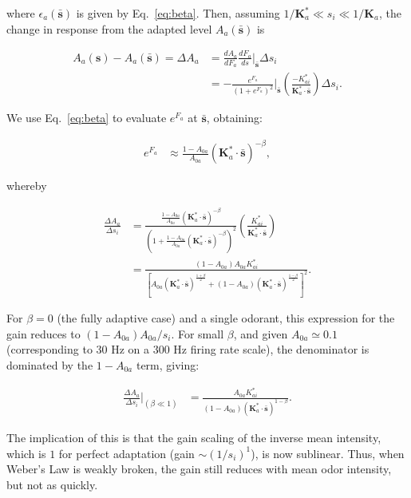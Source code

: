\documentclass[9pt,lineno]{elife}
\begin{document}
where $\epsilon_a(\bar {\mathbf s})$ is given by Eq.~\ref{eq:beta}.
Then, assuming $1/\mathbf{K}^*_a \ll s_i \ll 1/\mathbf{K}_a$, the change in response from the adapted level $A_a(\bar {\mathbf s})$ is

\begin{align}
A_a(\mathbf s) - A_a(\bar {\mathbf s}) = {\Delta A_a}%
&= \frac{dA_a}{dF_a}\frac{dF_a}{ds}\bigg|_{\bar {\mathbf s}}\Delta s_i \nonumber \\
&= -\frac{e^{F_a}}{(1 + e^{F_a})^2}\bigg|_{\bar {\mathbf s}}
\left(\frac{-K^*_{ai}}{\mathbf{K}^*_a\cdot \bar {\mathbf{s}}}\right) \Delta s_i.
\end{align}

We use Eq.~\ref{eq:beta} to evaluate $e^{F_a}$ at $\bar {\mathbf s}$, obtaining:

\begin{align}
e^{F_a} &\approx \frac{1 - A_{0a}}{A_{0a}}
(\mathbf{K}^*_a\cdot \bar {\mathbf{s}})^{-\beta},
\end{align}

whereby

\begin{align}
\frac{\Delta A_a}
{\Delta s_i}%
&= 
\frac{
	\frac{1 - A_{0a}}{A_{0a}}
	(\mathbf{K}^*_a\cdot \bar {\mathbf{s}})^{-\beta}
}
{(1 + \frac{1 - A_{0a}}{A_{0a}}
	(\mathbf{K}^*_a\cdot \bar {\mathbf{s}})^{-\beta})^2
}
\left(\frac{K^*_{ai}}{\mathbf{K}^*_a\cdot \bar {\mathbf{s}}}\right)\nonumber \\
&=\frac{(1 - A_{0a})A_{0a}K^*_{ai}}
{
	[
	A_{0a}(\mathbf{K}^*_a\cdot 
	\bar {\mathbf{s}})^{\frac{1+\beta}{2}}
	+
	(1 - A_{0a})(\mathbf{K}^*_a\cdot 
	\bar {\mathbf{s}})^{\frac{1-\beta}{2}}
	]^2
}.
\label{eq:full_gain_eq}
\end{align}


For $\beta = 0$ (the fully adaptive case) and a single odorant, this expression for the gain reduces to $(1 - A_{0a})A_{0a}/s_i$. For small $\beta$, and given $A_{0a} \simeq 0.1$ (corresponding to 30 Hz on a 300 Hz firing rate scale), the denominator is dominated by the $1 - A_{0a}$ term, giving:

\begin{align}
\frac{\Delta A_a}
{\Delta s_i}\bigg|_{(\beta \ll 1)}
&=\frac{A_{0a}K^*_{ai}}
{(1 - A_{0a})
	(\mathbf{K}^*_a\cdot 
	\bar {\mathbf{s}})^{1 - \beta}
}.
\end{align}

The implication of this is that the gain scaling of the inverse mean intensity, which is $1$ for perfect adaptation (gain $\sim (1/s_i)^1$), is now sublinear. Thus, when Weber's Law is weakly broken, the gain still reduces with mean odor intensity, but not as quickly. \\
\end{document}
